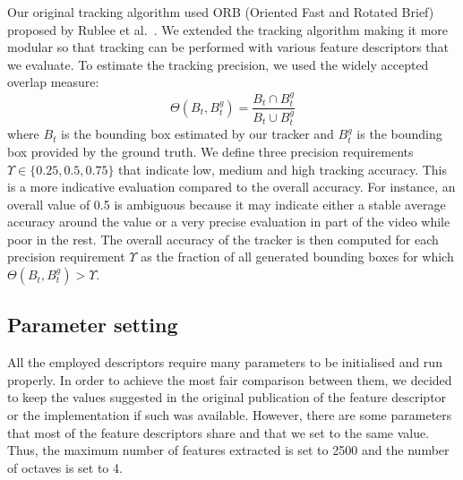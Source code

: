 Our original tracking algorithm used ORB (Oriented Fast and Rotated Brief) proposed by Rublee et al.~\cite{rublee11}. 
We extended the tracking algorithm making it more modular so that tracking can be performed with 
various feature descriptors that we evaluate. To estimate the tracking precision, we used the widely accepted overlap measure:
\begin{equation}
	\Theta (B_{t}, B^g_t) = \frac{B_{t} \cap B^g_t}{B_{t} \cup B^g_t}
\end{equation}
where \textit{$B_{t}$} is the bounding box estimated by our tracker and
\textit{$B^g_t$} is the bounding box provided by the ground truth. We define 
three precision requirements $\Upsilon \in \{0.25, 0.5, 0.75\}$ that indicate low, medium and high tracking accuracy. This is a more indicative evaluation compared to the overall accuracy. For instance, an overall value of 0.5 is ambiguous because it may indicate either a stable average accuracy around the value or a very precise evaluation in part of the video while poor in the rest.
%
%
%
%
%
The overall accuracy of the tracker is then computed for each precision requirement $\Upsilon$ as the fraction of all generated bounding boxes for which $\Theta(B_{t}, B^g_t) > \Upsilon$.



\subsection{Parameter setting}

All the employed descriptors require many parameters to be initialised and run properly. In order to achieve the most fair comparison between them, we decided to keep the values suggested in the original publication of the feature descriptor or the implementation if such was available. However, there are some parameters that most of the feature descriptors share and that we set to the same value. Thus, the maximum number of features extracted is set to 2500 and the number of octaves is set to 4.



